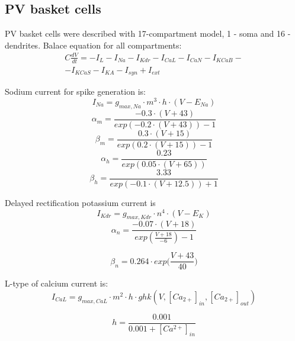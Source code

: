 \documentclass[a4paper,12pt]{article}
\begin{document}
\subsection{PV basket cells}
PV basket cells were described with 17-compartment model, 1 - soma and 16 - dendrites. Balace equation for all compartments:
\begin{eqnarray}
C\frac{dV}{dt}=-I_L-I_{Na}-I_{Kdr}-I_{CaL}-I_{CaN}-I_{KCaB}- \nonumber \\ 
-I_{KCaS}-I_{KA} -I_{syn} + I_{ext}
\end{eqnarray}

Sodium current for spike generation is:
\begin{equation}
\label{eq:Nav}
I_{Na} = g_{max, Na} \cdot m^3 \cdot h \cdot (V - E_{Na})
\end{equation}
\begin{equation}
\alpha_m = \frac{-0.3 \cdot (V + 43)}{exp(-0.2\cdot(V+43)) - 1}
\end{equation}
\begin{equation}
\beta_m = \frac{0.3 \cdot (V + 15)}{exp(0.2\cdot(V+15)) - 1}
\end{equation}
\begin{equation}
\alpha_h = \frac{0.23}{exp(0.05\cdot(V+65))}
\end{equation}
\begin{equation}
\beta_h = \frac{3.33}{exp(-0.1\cdot(V+12.5)) + 1}
\end{equation}

Delayed rectification potassium current is
\begin{equation}
\label{eq:Kdrfast}
I_{Kdr} = g_{max, Kdr} \cdot n^4 \cdot (V - E_K)
\end{equation}
\begin{equation}
\alpha_n = \frac{-0.07 \cdot(V + 18)}{exp(\frac{V + 18}{-6}) - 1}
\end{equation}

\begin{equation}
\beta_n = 0.264 \cdot exp \Big( \frac{V + 43}{40} \Big)
\end{equation}

L-type of calcium current is: 
\begin{equation}
\label{eq:CavL}
I_{CaL} = g_{max, CaL} \cdot m^2 \cdot h \cdot ghk(V, [Ca_{2+}]_{in}, [Ca_{2+}]_{out} )
\end{equation}

\begin{equation}
h = \frac{0.001}{0.001 +[Ca^{2+}]_{in} }
\end{equation}
\end{document}
